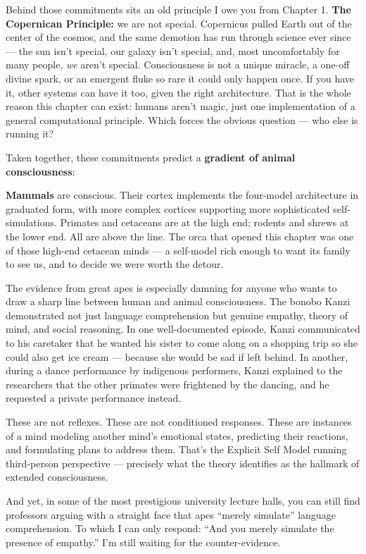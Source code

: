 \documentclass[11pt, twoside, openright]{book}
\begin{document}
Behind those commitments sits an old principle I owe you from Chapter 1. \textbf{The Copernican Principle:} we are not special. Copernicus pulled Earth out of the center of the cosmos, and the same demotion has run through science ever since --- the sun isn't special, our galaxy isn't special, and, most uncomfortably for many people, \textit{we} aren't special. Consciousness is not a unique miracle, a one-off divine spark, or an emergent fluke so rare it could only happen once. If you have it, other systems can have it too, given the right architecture. That is the whole reason this chapter can exist: humans aren't magic, just one implementation of a general computational principle. Which forces the obvious question --- who else is running it?

Taken together, these commitments predict a \textbf{gradient of animal consciousness}:

\textbf{Mammals} are conscious. Their cortex implements the four-model architecture in graduated form, with more complex cortices supporting more sophisticated self-simulations. Primates and cetaceans are at the high end; rodents and shrews at the lower end. All are above the line. The orca that opened this chapter was one of those high-end cetacean minds --- a self-model rich enough to want its family to see us, and to decide we were worth the detour.

The evidence from great apes is especially damning for anyone who wants to draw a sharp line between human and animal consciousness. The bonobo Kanzi demonstrated not just language comprehension but genuine empathy, theory of mind, and social reasoning. In one well-documented episode, Kanzi communicated to his caretaker that he wanted his sister to come along on a shopping trip so she could also get ice cream --- because she would be sad if left behind. In another, during a dance performance by indigenous performers, Kanzi explained to the researchers that the other primates were frightened by the dancing, and he requested a private performance instead.

These are not reflexes. These are not conditioned responses. These are instances of a mind modeling another mind's emotional states, predicting their reactions, and formulating plans to address them. That's the Explicit Self Model running third-person perspective --- precisely what the theory identifies as the hallmark of extended consciousness.

And yet, in some of the most prestigious university lecture halls, you can still find professors arguing with a straight face that apes ``merely simulate'' language comprehension. To which I can only respond: ``And you merely simulate the presence of empathy.'' I'm still waiting for the counter-evidence.
\end{document}
